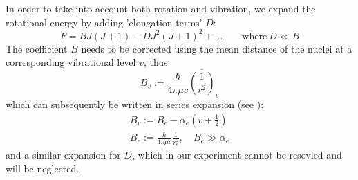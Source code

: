 In order to take into account both rotation and vibration, we expand 
the rotational energy by adding 'elongation terms' $D$:
\begin{equation}
    F = B J (J + 1) - D J^2 (J + 1)^2 + \ldots 
    \qquad \mathrm{where \ } D \ll B
    \label{eqn:E_rot}
\end{equation}
The coefficient $B$ needs to be corrected using the mean distance of 
the nuclei at a corresponding vibrational level $v$, thus 
\begin{equation}
    B_v := \frac{\hbar}{4 \pi \mu c} \overline{\left( \frac{1}{r^2}\right)}_v
\end{equation}
which can subsequently be written in series expansion 
(see \cite{herzberg1950spectra}):
\begin{eqnarray}
    B_v := B_e - \alpha_e \left (v + \frac{1}{2}\right ) 
    \label{eqn:B_v}\\
    B_e := \frac{\hbar}{4 \pi \mu c} \frac{1}{r_e^2}, \quad B_e \gg \alpha_e
    \label{eqn:B_e}
\end{eqnarray}
and a similar expansion for $D$, which in our experiment cannot be resovled 
and will be neglected.


